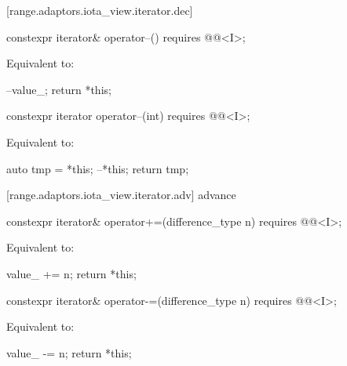 [range.adaptors.iota_view.iterator.dec]{}

\begin{itemdecl}
constexpr iterator& operator--() requires @@<I>;
\end{itemdecl}

\begin{itemdescr}
\pnum
\effects Equivalent to:
\begin{codeblock}
--value_;
return *this;
\end{codeblock}
\end{itemdescr}

\begin{itemdecl}
constexpr iterator operator--(int) requires @@<I>;
\end{itemdecl}

\begin{itemdescr}
\pnum
\effects Equivalent to:
\begin{codeblock}
auto tmp = *this;
--*this;
return tmp;
\end{codeblock}
\end{itemdescr}

[range.adaptors.iota_view.iterator.adv]{ advance}

\begin{itemdecl}
constexpr iterator& operator+=(difference_type n)
  requires @@<I>;
\end{itemdecl}

\begin{itemdescr}
\pnum
\effects Equivalent to:
\begin{codeblock}
value_ += n;
return *this;
\end{codeblock}
\end{itemdescr}

\begin{itemdecl}
constexpr iterator& operator-=(difference_type n)
  requires @@<I>;
\end{itemdecl}

\begin{itemdescr}
\pnum
\effects Equivalent to:
\begin{codeblock}
value_ -= n;
return *this;
\end{codeblock}
\end{itemdescr}


